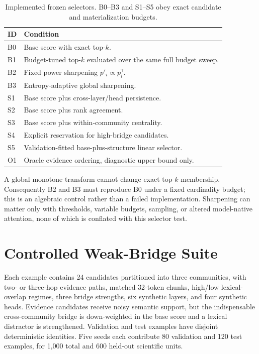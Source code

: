 \documentclass[10pt]{article}
\begin{document}
\begin{table}[H]\centering\small
\begin{tabular}{p{.10\linewidth}p{.80\linewidth}}\toprule
ID & Condition\\\midrule
B0 & Base score with exact top-$k$.\\
B1 & Budget-tuned top-$k$ evaluated over the same full budget sweep.\\
B2 & Fixed power sharpening $p'_i\propto p_i^\gamma$.\\
B3 & Entropy-adaptive global sharpening.\\
S1 & Base score plus cross-layer/head persistence.\\
S2 & Base score plus rank agreement.\\
S3 & Base score plus within-community centrality.\\
S4 & Explicit reservation for high-bridge candidates.\\
S5 & Validation-fitted base-plus-structure linear selector.\\
O1 & Oracle evidence ordering, diagnostic upper bound only.\\
\bottomrule\end{tabular}
\caption{Implemented frozen selectors. B0--B3 and S1--S5 obey exact candidate and materialization budgets.}
\label{tab:conditions}
\end{table}

A global monotone transform cannot change exact top-$k$ membership. Consequently B2 and B3 must reproduce B0 under a fixed cardinality budget; this is an algebraic control rather than a failed implementation. Sharpening can matter only with thresholds, variable budgets, sampling, or altered model-native attention, none of which is conflated with this selector test.

\section{Controlled Weak-Bridge Suite}

Each example contains 24 candidates partitioned into three communities, with two- or three-hop evidence paths, matched 32-token chunks, high/low lexical-overlap regimes, three bridge strengths, six synthetic layers, and four synthetic heads. Evidence candidates receive noisy semantic support, but the indispensable cross-community bridge is down-weighted in the base score and a lexical distractor is strengthened. Validation and test examples have disjoint deterministic identities. Five seeds each contribute 80 validation and 120 test examples, for 1,000 total and 600 held-out scientific units.
\end{document}
